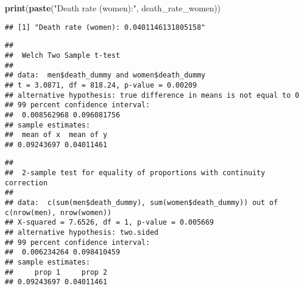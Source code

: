 \documentclass[
]{article}
\newenvironment{Shaded}{\begin{snugshade}}{\end{snugshade}}
\newcommand{\AttributeTok}[1]{\textcolor[rgb]{0.13,0.29,0.53}{#1}}
\newcommand{\CommentTok}[1]{\textcolor[rgb]{0.56,0.35,0.01}{\textit{#1}}}
\newcommand{\FloatTok}[1]{\textcolor[rgb]{0.00,0.00,0.81}{#1}}
\newcommand{\FunctionTok}[1]{\textcolor[rgb]{0.13,0.29,0.53}{\textbf{#1}}}
\newcommand{\NormalTok}[1]{#1}
\newcommand{\OtherTok}[1]{\textcolor[rgb]{0.56,0.35,0.01}{#1}}
\newcommand{\SpecialCharTok}[1]{\textcolor[rgb]{0.81,0.36,0.00}{\textbf{#1}}}
\newcommand{\StringTok}[1]{\textcolor[rgb]{0.31,0.60,0.02}{#1}}
\begin{document}
\begin{Shaded}
\begin{Highlighting}[]
\FunctionTok{print}\NormalTok{(}\FunctionTok{paste}\NormalTok{(}\StringTok{"Death rate (women):"}\NormalTok{, death\_rate\_women))}
\end{Highlighting}
\end{Shaded}

\begin{verbatim}
## [1] "Death rate (women): 0.0401146131805158"
\end{verbatim}

\begin{Shaded}
\end{Shaded}

\begin{verbatim}
## 
##  Welch Two Sample t-test
## 
## data:  men$death_dummy and women$death_dummy
## t = 3.0871, df = 818.24, p-value = 0.00209
## alternative hypothesis: true difference in means is not equal to 0
## 99 percent confidence interval:
##  0.008562968 0.096081756
## sample estimates:
##  mean of x  mean of y 
## 0.09243697 0.04011461
\end{verbatim}

\begin{Shaded}
\end{Shaded}

\begin{verbatim}
## 
##  2-sample test for equality of proportions with continuity correction
## 
## data:  c(sum(men$death_dummy), sum(women$death_dummy)) out of c(nrow(men), nrow(women))
## X-squared = 7.6526, df = 1, p-value = 0.005669
## alternative hypothesis: two.sided
## 99 percent confidence interval:
##  0.006234264 0.098410459
## sample estimates:
##     prop 1     prop 2 
## 0.09243697 0.04011461
\end{verbatim}
\end{document}
